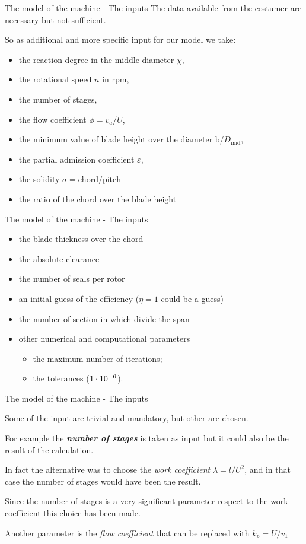 \documentclass{beamer}
\newcommand{\myspace}[0]{\vspace{0.3cm}}
\newcommand{\dmid}{D_\text{mid}}
\begin{document}
\begin{frame}[t]{The model of the machine - The inputs}
The data available from the costumer are necessary but not sufficient.

So as additional and more specific input for our model we take:
\begin{itemize}
	\item the reaction degree in the middle diameter $\chi$,
	\item the rotational speed $n$ in $\text{rpm}$,
	\item the number of stages,
	\item the flow coefficient $\phi = {v}_{a} / U$,
	\item the minimum value of blade height over the diameter $\text{b} / \dmid$,
	\item the partial admission coefficient $\varepsilon$,
	\item the solidity $\sigma = \text{chord} / \text{pitch}$
	\item the ratio of the chord over the blade height
\end{itemize}
\end{frame}

\begin{frame}[t]{The model of the machine - The inputs}
\begin{itemize}
	\item the blade thickness over the chord
	\item the absolute clearance
	\item the number of seals per rotor
	\item an initial guess of the efficiency ($\eta = 1$ could be a guess)
	\item the number of section in which divide the span
	\item other numerical and computational parameters
		\begin{itemize}
			\item the maximum number of iterations;
			\item the tolerances ($1\cdot 10^{-6}$).
		\end{itemize}
\end{itemize}
\end{frame}

\begin{frame}[t]{The model of the machine - The inputs}

Some of the input are trivial and mandatory, but other are chosen.

\myspace
For example the \textbf{\emph{number of stages}} is taken as input but it could also be the result of the calculation. 

In fact the alternative was to choose the \emph{work coefficient} $\lambda = l / U^2$, and in that case the number of stages would have been the result.

\myspace
Since the number of stages is a very significant parameter respect to the work coefficient this choice has been made.

\myspace
Another parameter is the \emph{flow coefficient} that can be replaced with $k_p = U / v_1$
\end{frame}
\end{document}
